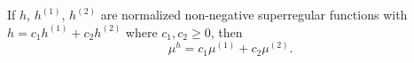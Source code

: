 If $h$, $h^{(1)}$, $h^{(2)}$ are normalized non-negative superregular functions with $h = c_1 h^{(1)} + c_2 h^{(2)}$ where $c_1, c_2 \geq 0$, then
$$\mu^h = c_1 \mu^{(1)} + c_2 \mu^{(2)}.$$
